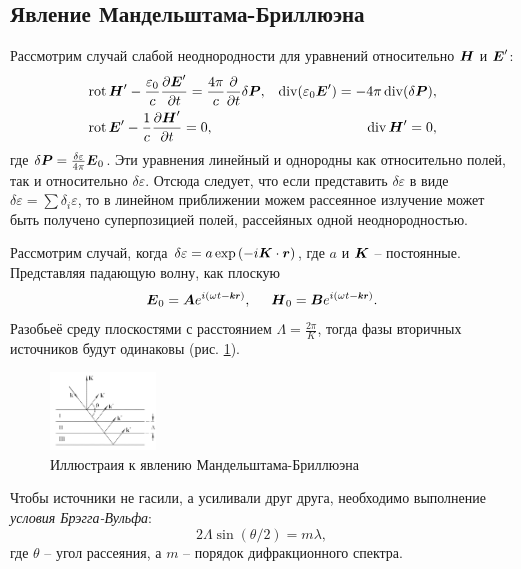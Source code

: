 \subsection{Явление Мандельштама-Бриллюэна}


Рассмотрим случай слабой неоднородности для уравнений относительно $\mbox{\boldmath $H$}$ и $\mbox{\boldmath $E$}'$:
\begin{align*}
    &\mathop{\mathrm{rot}}\nolimits \mbox{\boldmath $H$}' - \frac{\varepsilon_0}{c}\frac{\partial \mbox{\boldmath $E$}'}{\partial t} = \frac{4\pi}{c} \frac{\partial }{\partial t} \delta \mbox{\boldmath $P$},
    &\mathop{\mathrm{div}}\nolimits(\varepsilon_0 \mbox{\boldmath $E$}') = - 4 \pi \mathop{\mathrm{div}}\nolimits (\delta \mbox{\boldmath $P$}), \\
    &\mathop{\mathrm{rot}}\nolimits \mbox{\boldmath $E$}' - \frac{1}{c} \frac{\partial \mbox{\boldmath $H$}'}{\partial t} =0,
    &\mathop{\mathrm{div}}\nolimits \mbox{\boldmath $H$}' = 0,
\end{align*}
где $\delta \mbox{\boldmath $P$} = \frac{\delta \varepsilon}{4 \pi} \mbox{\boldmath $E$}_0$. 
Эти уравнения линейный и однородны как относительно полей, так и относительно $\delta \varepsilon$. Отсюда следует, что если представить $\delta \varepsilon$ в виде $\delta \varepsilon = \sum \delta_i \varepsilon$, то в линейном приближении можем рассеянное излучение может быть получено суперпозицией полей, рассейяных одной неоднородностью. 

Рассмотрим случай, когда $\delta \varepsilon = a \exp\left(-i \mbox{\boldmath $K$} \cdot \mbox{\boldmath $r$}\right)$, где $a$ и $\mbox{\boldmath $K$}$ -- постоянные. Представляя падающую волну, как плоскую
\begin{equation*}
    \vc{E}_0 = \vc{A} e^{i(\omega t - \smallvc{k} \smallvc{r})},
    \hspace{5 mm} 
    \vc{H}_0 = \vc{B} e^{i(\omega t -\smallvc{k} \smallvc{r})}.
\end{equation*}
Разобьеё среду плоскостями с расстоянием $\Lambda = \frac{2\pi}{K}$, тогда фазы вторичных источников будут одинаковы (рис. \ref{fig:ggg}). 
\begin{figure}[ht]
    \centering
    \includegraphics[width=0.25\textwidth]{figures/ggg.png}
    \caption{Иллюстраия к явлению Мандельштама-Бриллюэна}
    \label{fig:ggg}
\end{figure}
Чтобы источники не гасили, а усиливали друг друга, необходимо выполнение \textit{условия Брэгга-Вульфа}:
\begin{equation*}
    2 \Lambda \sin(\theta/2) = m \lambda,
\end{equation*}
где $\theta$ -- угол рассеяния, а $m$ -- порядок дифракционного спектра. 


